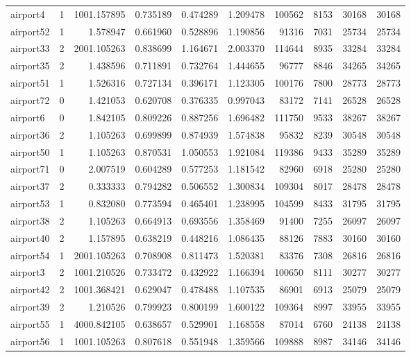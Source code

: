 \begin{longtable}{|l|r|r|r|r|r|r|r|r|r|}
airport4 & 1 & 1001.157895 & 0.735189 & 0.474289 & 1.209478 & 100562 & 8153 & 30168 & 30168 \\
airport52 & 1 & 1.578947 & 0.661960 & 0.528896 & 1.190856 & 91316 & 7031 & 25734 & 25734 \\
airport33 & 2 & 2001.105263 & 0.838699 & 1.164671 & 2.003370 & 114644 & 8935 & 33284 & 33284 \\
airport35 & 2 & 1.438596 & 0.711891 & 0.732764 & 1.444655 & 96777 & 8846 & 34265 & 34265 \\
airport51 & 1 & 1.526316 & 0.727134 & 0.396171 & 1.123305 & 100176 & 7800 & 28773 & 28773 \\
airport72 & 0 & 1.421053 & 0.620708 & 0.376335 & 0.997043 & 83172 & 7141 & 26528 & 26528 \\
airport6 & 0 & 1.842105 & 0.809226 & 0.887256 & 1.696482 & 111750 & 9533 & 38267 & 38267 \\
airport36 & 2 & 1.105263 & 0.699899 & 0.874939 & 1.574838 & 95832 & 8239 & 30548 & 30548 \\
airport50 & 1 & 1.105263 & 0.870531 & 1.050553 & 1.921084 & 119386 & 9433 & 35289 & 35289 \\
airport71 & 0 & 2.007519 & 0.604289 & 0.577253 & 1.181542 & 82960 & 6918 & 25280 & 25280 \\
airport37 & 2 & 0.333333 & 0.794282 & 0.506552 & 1.300834 & 109304 & 8017 & 28478 & 28478 \\
airport53 & 1 & 0.832080 & 0.773594 & 0.465401 & 1.238995 & 104599 & 8433 & 31795 & 31795 \\
airport38 & 2 & 1.105263 & 0.664913 & 0.693556 & 1.358469 & 91400 & 7255 & 26097 & 26097 \\
airport40 & 2 & 1.157895 & 0.638219 & 0.448216 & 1.086435 & 88126 & 7883 & 30160 & 30160 \\
airport54 & 1 & 2001.105263 & 0.708908 & 0.811473 & 1.520381 & 83376 & 7308 & 26816 & 26816 \\
airport3 & 2 & 1001.210526 & 0.733472 & 0.432922 & 1.166394 & 100650 & 8111 & 30277 & 30277 \\
airport42 & 2 & 1001.368421 & 0.629047 & 0.478488 & 1.107535 & 86901 & 6913 & 25079 & 25079 \\
airport39 & 2 & 1.210526 & 0.799923 & 0.800199 & 1.600122 & 109364 & 8997 & 33955 & 33955 \\
airport55 & 1 & 4000.842105 & 0.638657 & 0.529901 & 1.168558 & 87014 & 6760 & 24138 & 24138 \\
airport56 & 1 & 1001.105263 & 0.807618 & 0.551948 & 1.359566 & 109888 & 8987 & 34146 & 34146 \\

\end{longtable}
